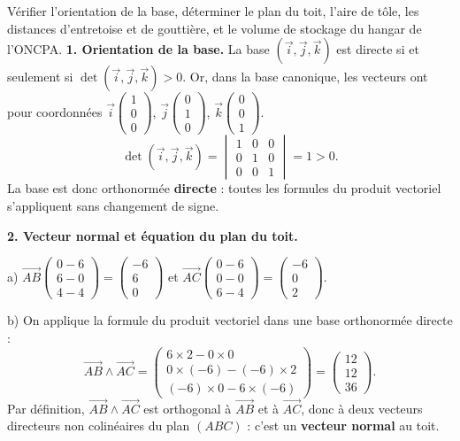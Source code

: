 \documentclass[11pt]{article}
\begin{document}
\begin{exoresolu}
Vérifier l'orientation de la base, déterminer le plan du toit, l'aire de tôle, les distances d'entretoise et de gouttière, et le volume de stockage du hangar de l'ONCPA.
\tcblower
\textbf{1. Orientation de la base.}
La base $(\vec{i},\vec{j},\vec{k})$ est directe si et seulement si $\det(\vec{i},\vec{j},\vec{k})>0$. Or, dans la base canonique, les vecteurs ont pour coordonnées $\vec{i}\begin{pmatrix}1\\0\\0\end{pmatrix}$, $\vec{j}\begin{pmatrix}0\\1\\0\end{pmatrix}$, $\vec{k}\begin{pmatrix}0\\0\\1\end{pmatrix}$.
\[ \det(\vec{i},\vec{j},\vec{k})=\begin{vmatrix} 1&0&0\\0&1&0\\0&0&1 \end{vmatrix}=1>0. \]
La base est donc orthonormée \textbf{directe} : toutes les formules du produit vectoriel s'appliquent sans changement de signe.

\textbf{2. Vecteur normal et équation du plan du toit.}

a) $\overrightarrow{AB}\begin{pmatrix}0-6\\6-0\\4-4\end{pmatrix}=\begin{pmatrix}-6\\6\\0\end{pmatrix}$ et $\overrightarrow{AC}\begin{pmatrix}0-6\\0-0\\6-4\end{pmatrix}=\begin{pmatrix}-6\\0\\2\end{pmatrix}$.

b) On applique la formule du produit vectoriel dans une base orthonormée directe :
\[ \overrightarrow{AB}\wedge\overrightarrow{AC}=\begin{pmatrix} 6\times 2-0\times 0 \\ 0\times(-6)-(-6)\times 2 \\ (-6)\times 0-6\times(-6) \end{pmatrix}=\begin{pmatrix}12\\12\\36\end{pmatrix}. \]
Par définition, $\overrightarrow{AB}\wedge\overrightarrow{AC}$ est orthogonal à $\overrightarrow{AB}$ et à $\overrightarrow{AC}$, donc à deux vecteurs directeurs non colinéaires du plan $(ABC)$ : c'est un \textbf{vecteur normal} au toit.


\end{exoresolu}
\end{document}
